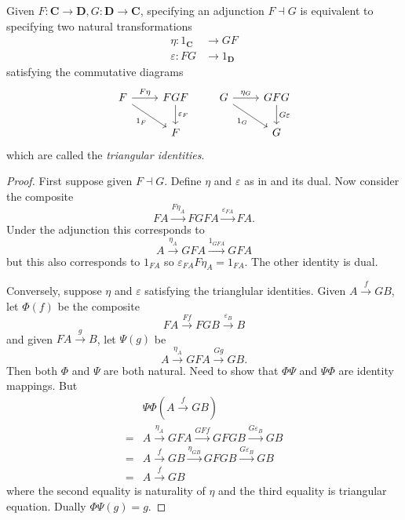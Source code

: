 \documentclass[a4paper]{article}
\renewcommand{\c}[1]{\mathbf{#1}}
\newcommand{\adjoint}{\dashv}
\begin{document}
\begin{theorem}
  Given \(F: \c C \to \c D, G: \c D \to \c C\), specifying an adjunction \(F \adjoint G\) is equivalent to specifying two natural transformations
  \begin{align*}
    \eta: 1_{\c C} &\to GF \\
    \varepsilon: FG &\to 1_{\c D}
  \end{align*}
  satisfying the commutative diagrams
  \[
    \begin{tikzcd}
      F \ar[r, "F\eta"] \ar[dr, "1_F"'] & FGF \ar[d, "\varepsilon_F"] \\
      & F
    \end{tikzcd}
    \qquad
    \begin{tikzcd}
      G \ar[r, "\eta_G"] \ar[dr, "1_G"'] & GFG \ar[d, "G\varepsilon"] \\
      & G
    \end{tikzcd}
  \]
  which are called the \emph{triangular identities}.
\end{theorem}

\begin{proof}
  First suppose given \(F \adjoint G\). Define \(\eta\) and \(\varepsilon\) as in  and its dual. Now consider the composite
  \[
    FA \xrightarrow{F\eta_A} FGFA \xrightarrow{\varepsilon_{FA}} FA.
  \]
  Under the adjunction this corresponds to
  \[
    A \xrightarrow{\eta_A} GFA \xrightarrow{1_{GFA}} GFA
  \]
  but this also corresponds to \(1_{FA}\) so \(\varepsilon_{FA} F\eta_A = 1_{FA}\). The other identity is dual.

  Conversely, suppose \(\eta\) and \(\varepsilon\) satisfying the trianglular identities. Given \(A \xrightarrow{f} GB\), let \(\Phi(f)\) be the composite
  \[
    FA \xrightarrow{Ff} FGB \xrightarrow{\varepsilon_B} B
  \]
  and given \(FA \xrightarrow{g} B\), let \(\Psi(g)\) be
  \[
    A \xrightarrow{\eta_A} GFA \xrightarrow{Gg} GB.
  \]
  Then both \(\Phi\) and \(\Psi\) are both natural. Need to show that \(\Phi\Psi\) and \(\Psi\Phi\) are identity mappings. But
  \begin{align*}
    &\Psi\Phi(A \xrightarrow{f} GB) \\
    =& A \xrightarrow{\eta_A} GFA \xrightarrow{GFf} GFGB \xrightarrow{G \varepsilon_B} GB \\
    =& A \xrightarrow{f} GB \xrightarrow{\eta_{GB}} GFGB \xrightarrow{G\varepsilon_B} GB \\
    =& A \xrightarrow{f} GB
  \end{align*}
  where the second equality is naturality of \(\eta\) and the third equality is triangular equation. Dually \(\Phi\Psi(g) = g\).
\end{proof}
\end{document}
